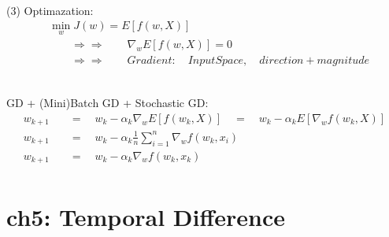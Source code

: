 \documentclass{article}
\begin{document}
~ \\[3pt]
(3) Optimazation: 
\begin{align*}
    & \min_{w} J(w) = E \left[ f(w, X) \right] \\[3pt]
    & \qquad \Rightarrow \Rightarrow \qquad 
    \nabla_{w} E \left[ f(w, X) \right] = 0 \\[3pt]
    & \qquad \Rightarrow \Rightarrow \qquad 
    Gradient: \quad InputSpace, \quad direction + magnitude 
\end{align*}


~ \\[3pt]
GD \quad + \quad (Mini)Batch GD \quad + \quad Stochastic GD: 
\begin{align*}
    w_{k+1} & 
            \quad = \quad w_{k} - \alpha_{k} 
            \nabla_{w} E \left[ f(w_{k}, X) \right] 
            \quad = \quad w_{k} - \alpha_{k} 
            E \left[ \nabla_{w} f(w_{k}, X) \right] \\[3pt]
    w_{k+1} & 
            \quad = \quad w_{k} - \alpha_{k} 
            \frac {1} {n} \sum_{i=1}^{n} 
            \nabla_{w} f(w_{k}, x_{i}) \\[3pt]
    w_{k+1} & 
            \quad = \quad w_{k} - \alpha_{k} 
            \nabla_{w} f(w_{k}, x_{k}) \\[3pt]
\end{align*}


\newpage
\section*{ch5: Temporal Difference}
\end{document}
